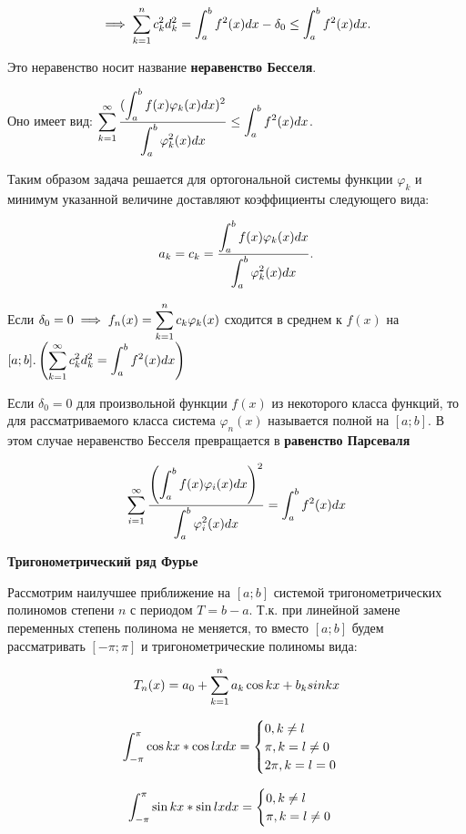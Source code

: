 \begin{definition}
    \[ \implies \displaystyle\sum_{k=1}^n c_k^2d_k^2 = \displaystyle\int_a^b f^2(x)dx - \delta_0 \leq \displaystyle\int_a^bf^2(x)dx. \]

    Это неравенство носит название \textbf{неравенство Бесселя}.

    Оно имеет вид: $\displaystyle\sum_{k=1}^\infty \frac{(\displaystyle\int_a^b f(x)\varphi_k(x)dx)^2}{\displaystyle\int_a^b \varphi_k^2(x)dx} \leq \displaystyle\int_a^b f^2(x) dx$.

    Таким образом задача решается для ортогональной системы функции $\varphi_k$ 
    и минимум указанной величине доставляют коэффициенты следующего вида:

    \[ a_k = c_k = \frac{\displaystyle\int_a^b f(x) \varphi_k(x)dx}{\displaystyle\int_a^b \varphi_k^2(x) dx}. \]

    Если $\delta_0 = 0 \implies f_n(x) = \displaystyle\sum_{k=1}^n c_k\varphi_k(x)$ сходится
    в среднем к $f(x)$ на $[a ; b]. \left(\displaystyle\sum_{k=1}^\infty c_k^2 d_k^2 = \displaystyle\int_a^b f^2(x)dx \right)$ 
    
\end{definition}


\begin{definition}
    Если $\delta_0 = 0$ для произвольной функции $f(x)$ из некоторого класса функций,
    то для рассматриваемого класса система $\varphi_n(x)$ называется полной на $[a ; b]$.
    В этом случае неравенство Бесселя превращается в \textbf{равенство Парсеваля}

    \[\displaystyle\sum_{i=1}^\infty \frac{\left(\displaystyle\int_a^b f(x) \varphi_i(x) dx \right)^2}{\displaystyle\int_a^b \varphi_i^2(x) dx} 
    = \displaystyle\int_a^b f^2(x) dx \]     
\end{definition}


\textbf{Тригонометрический ряд Фурье}

Рассмотрим наилучшее приближение на $[a ; b]$ системой тригонометрических полиномов
степени $n$ с периодом $T=b-a$. Т.к. при линейной замене переменных степень полинома
не меняется, то вместо $[a ; b]$ будем рассматривать $[-\pi ; \pi]$ и тригонометрические
полиномы вида:

\[T_n(x) = a_0 + \displaystyle\sum_{k=1}^n a_k \cos kx + b_k sin kx \]

\[\displaystyle\int_{-\pi}^\pi \cos kx * \cos lx dx =
 \begin{cases}
    0, k \neq l \\
    \pi, k = l \neq 0 \\
    2\pi, k = l = 0   
  \end{cases}
\]

\[ \displaystyle\int_{-\pi}^\pi \sin kx * \sin lx dx =
 \begin{cases}
    0, k \neq l \\
    \pi, k = l \neq 0
 \end{cases}   
\]

